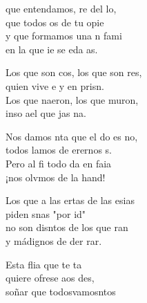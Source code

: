 \begin{cancion}%
	 que entendamos, re del lo,\\
	que todos os de tu opie\\
	y que formamos una n fami\\
	en la que ie se eda as. \jump\\
	\begin{chorus}%
		Los que son cos, los que son res,\\
		quien vive e y en prisn. \\
		Los que naeron, los que muron,\\
		inso ael que jas na.  \jump\\
	\end{chorus}%
	Nos damos nta que el do es no,\\
	todos lamos de erernos s.\\
	Pero al fi todo da en faia\\
	¡nos olvmos de la hand!\jump\\
	\begin{chorus}%
		Los que a las ertas de las esias\\
		piden snas "por i\chord{Do}{}{da}d"\\
		no son disntos de los que ran\\
		y  mádignos de der rar.\jump\\
	\end{chorus}%
	Esta flia que  te ta\\
	quiere ofrese aos des,\\
	soñar que todosvamosntos\\

\end{cancion}
